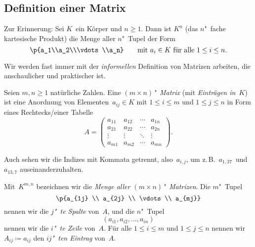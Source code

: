 \documentclass[a4paper]{article}
\begin{document}
\subsection{Definition einer Matrix}

Zur Erinnerung: Sei $K$~ein Körper und $n \geq 1$. Dann ist $K^n$ (das $n$"~fache kartesische Produkt) die Menge aller $n$"~Tupel der Form
\begin{equation*}
    \p{a_1\\a_2\\\vdots\\a_n} \qquad\text{mit } a_i \in K \text{ für alle } 1 \leq i \leq n.
\end{equation*}

Wir werden fast immer mit der \emph{informellen} Definition von Matrizen arbeiten, die anschaulicher und praktischer ist.

\begin{definition}
    Seien $m,n \geq 1$ natürliche Zahlen. Eine \emph{$(m\times n)$"~Matrix} (mit \emph{Einträgen in~$K$}) ist eine Anordnung von Elementen~$a_{ij} \in K$ mit $1 \leq i \leq m$ und $1 \leq j \leq n$ in Form eines Rechtecks\slash einer Tabelle
    \begin{equation*}
        A = \begin{pmatrix}
            a_{11} & a_{12} & \cdots & a_{1n} \\
            a_{21} & a_{22} & \cdots & a_{2n} \\
            \vdots & \vdots & \ddots & \vdots \\
            a_{m1} & a_{m2} & \cdots & a_{mn}
        \end{pmatrix}.
    \end{equation*}
\end{definition}

Auch sehen wir die Indizes mit Kommata getrennt, also~$a_{i,j}$, um z.\,B.\ $a_{1, 37}$~und~$a_{13, 7}$ auseinanderzuhalten.

\begin{notation}
    Mit~$K^{m,n}$ bezeichnen wir die \emph{Menge aller $(m\times n)$"~Matrizen}. Die $m$"~Tupel
    \begin{equation*}
        \p{a_{1j} \\ a_{2j} \\ \vdots \\ a_{mj}}
    \end{equation*}
    nennen wir die \emph{$j$"~te Spalte} von~$A$, und die $n$"~Tupel
    \begin{equation*}
        (a_{i1}, a_{i2}, \dots, a_{in})
    \end{equation*}
    nennen wir die \emph{$i$"~te Zeile} von~$A$. Für alle $1 \leq i \leq m$ und $1 \leq j \leq n$ nennen wir $A_{ij} \coloneqq a_{ij}$ den \emph{$ij$"~ten Eintrag} von~$A$.
\end{notation}
\end{document}
